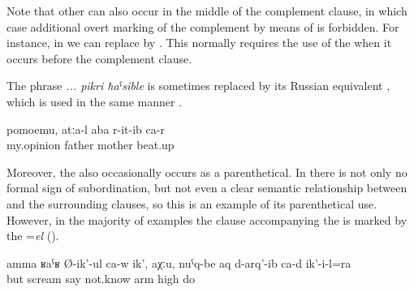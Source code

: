 Note that other  can also occur in the middle of the complement clause, in which case additional overt marking of the complement by means of  is forbidden. For instance, in  we can replace  by  . This  normally requires the use of the   when it occurs before the complement clause.

The phrase \textit{... pikri ħaˁsible} is sometimes replaced by its Russian equivalent , which is used in the same manner . 
%
\begin{exe}
	\ex	\label{ex:In my mind, the father beat up the mother@23}
	\gll	pomoemu,	atːa-l	aba	r-it-ib	ca-r\\
		my.opinion	father	mother	beat.up	\\
	\glt	{}
\end{exe}

Moreover, the    also occasionally occurs as a parenthetical. In  there is not only no formal sign of subordination, but not even a clear semantic relationship between  and the surrounding clauses, so this is an example of its parenthetical use. However, in the majority of examples the clause accompanying the  is marked by the  =\textit{el} ().
%
\begin{exe}
	\ex	\label{ex:But he is screaming, I don't know, he also rose up his arms@21}
	\gll	amma	ʁaˁʁ Ø-ik'-ul ca-w	ik',	aχːu,	nuˁq-be	aq d-arq'-ib	ca-d	ik'-i-l=ra\\
		but	scream say 		not.know	arm		high do		\\
	\glt	{}
\end{exe}




